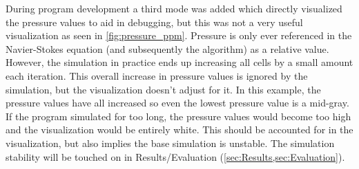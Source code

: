 \label{sec:VizPressureCritique}
During program development a third mode was added which directly visualized the pressure values to aid in debugging, but this was not a very useful visualization as seen in \cref{fig:pressure_ppm}.
Pressure is only ever referenced in the Navier-Stokes equation (and subsequently the algorithm) as a relative value.
However, the simulation in practice ends up increasing all cells by a small amount each iteration.
This overall increase in pressure values is ignored by the simulation, but the visualization doesn't adjust for it.
In this example, the pressure values have all increased so even the lowest pressure value is a mid-gray.
If the program simulated for too long, the pressure values would become too high and the visualization would be entirely white.
This should be accounted for in the visualization, but also implies the base simulation is unstable.
The simulation stability will be touched on in Results/Evaluation (\cref{sec:Results,sec:Evaluation}).